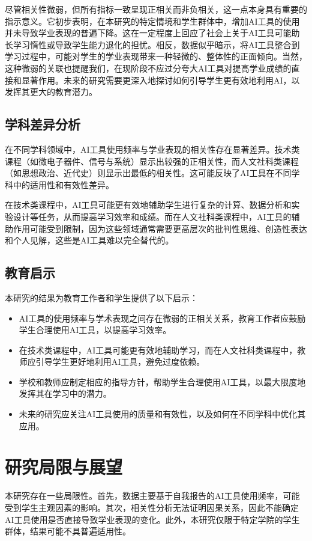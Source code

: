 \documentclass[a4paper,12pt]{article}
\begin{document}
尽管相关性微弱，但所有指标一致呈现正相关而非负相关，这一点本身具有重要的指示意义。它初步表明，在本研究的特定情境和学生群体中，增加AI工具的使用并未导致学业表现的普遍下降。这在一定程度上回应了社会上关于AI工具可能助长学习惰性或导致学生能力退化的担忧。相反，数据似乎暗示，将AI工具整合到学习过程中，可能对学生的学业表现带来一种轻微的、整体性的正面倾向。当然，这种微弱的关联也提醒我们，在现阶段不应过分夸大AI工具对提高学业成绩的直接和显著作用。未来的研究需要更深入地探讨如何引导学生更有效地利用AI，以发挥其更大的教育潜力。


\subsection{学科差异分析}

在不同学科领域中，AI工具使用频率与学业表现的相关性存在显著差异。技术类课程（如微电子器件、信号与系统）显示出较强的正相关性，而人文社科类课程（如思想政治、近代史）则显示出最低的相关性。这可能反映了AI工具在不同学科中的适用性和有效性差异。

在技术类课程中，AI工具可能更有效地辅助学生进行复杂的计算、数据分析和实验设计等任务，从而提高学习效率和成绩。而在人文社科类课程中，AI工具的辅助作用可能受到限制，因为这些领域通常需要更高层次的批判性思维、创造性表达和个人见解，这些是AI工具难以完全替代的。

\subsection{教育启示}

本研究的结果为教育工作者和学生提供了以下启示：
\begin{itemize}
    \item AI工具的使用频率与学术表现之间存在微弱的正相关关系，教育工作者应鼓励学生合理使用AI工具，以提高学习效率。
    \item 在技术类课程中，AI工具可能更有效地辅助学习，而在人文社科类课程中，教师应引导学生更好地利用AI工具，避免过度依赖。
    \item 学校和教师应制定相应的指导方针，帮助学生合理使用AI工具，以最大限度地发挥其在学习中的潜力。
    \item 未来的研究应关注AI工具使用的质量和有效性，以及如何在不同学科中优化其应用。
\end{itemize}

\section{研究局限与展望}

本研究存在一些局限性。首先，数据主要基于自我报告的AI工具使用频率，可能受到学生主观因素的影响。其次，相关性分析无法证明因果关系，因此不能确定AI工具使用是否直接导致学业表现的变化。此外，本研究仅限于特定学院的学生群体，结果可能不具普遍适用性。
\end{document}
